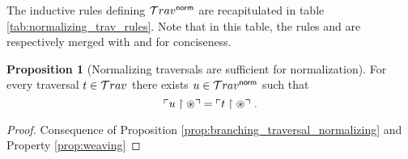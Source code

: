 \documentclass{article}
\theoremstyle{definition}
\newtheorem{proposition}{Proposition}[section]
\newcommand{\normalizing}{{\sf norm}}
\newcommand{\travsetnorm}{{\travset^\normalizing}}
\begin{document}
The inductive rules defining $\travsetnorm$ are recapitulated in table \ref{tab:normalizing_trav_rules}. Note that in this table, the rules  and  are respectively merged with  and  for conciseness.

\begin{proposition}[Normalizing traversals are sufficient for normalization]
\label{prop:normalizing_traversal_normalizing}
For every traversal $t\in\mathcal{T}rav$ there exists $u \in \travsetnorm$ such that
$$\ulcorner u\upharpoonright\circledast \urcorner = \ulcorner t\upharpoonright\circledast \urcorner \ .$$
\end{proposition}
\begin{proof}
Consequence of Proposition \ref{prop:branching_traversal_normalizing} and Property \ref{prop:weaving}
\end{proof}
\end{document}
